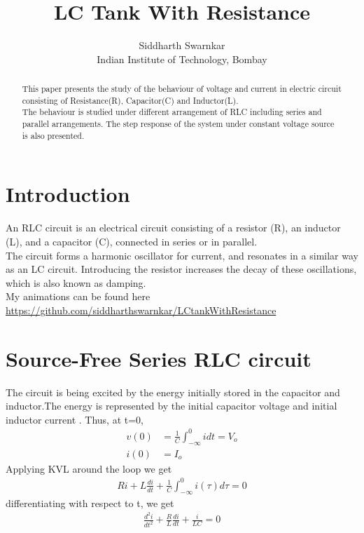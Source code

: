 \documentclass[11pt,a4paper]{article}
\title{LC Tank With Resistance}
\author{Siddharth Swarnkar \\ 
Indian Institute of Technology, Bombay}
\begin{document}
\maketitle

\begin{abstract}
This paper presents the study of the behaviour of voltage and current in electric circuit consisting of  Resistance(R), Capacitor(C) and Inductor(L).\\
The behaviour is studied under different arrangement of RLC including series and parallel arrangements. The step response of the system under constant voltage source is also presented.
\end{abstract}

\section{Introduction \cite{Wiki} }
An RLC circuit is an electrical circuit consisting of a resistor (R), an inductor (L), and a capacitor (C), connected in series or in parallel.\\
The circuit forms a harmonic oscillator for current, and resonates in a similar way as an LC circuit. Introducing the resistor increases the decay of these oscillations, which is also known as damping. \\
My animations can be found here \url{https://github.com/siddharthswarnkar/LCtankWithResistance}
\section{Source-Free Series RLC circuit \cite{Alexander}}
The circuit is being excited by the energy initially stored in the capacitor and inductor.The energy is represented by the initial capacitor voltage and initial inductor current . Thus, at t=0,\\
\begin{align}
v(0) &= \frac{1}{C}\int_{-\infty}^{0}idt = V_o \label{1} \\
i(0) &= I_o \label{2}
\end{align}
Applying KVL around the loop we get \\
\begin{align}
Ri+L\frac{di}{dt}+\frac{1}{C}\int_{-\infty}^{0}i(\tau)d\tau = 0 \label{3}
\end{align}
differentiating with respect to t, we get \\
\begin{align}
\frac{d^2i}{dt^2} + \frac{R}{L}\frac{di}{dt}+\frac{i}{LC}=0 \label{4}
\end{align}
\end{document}
